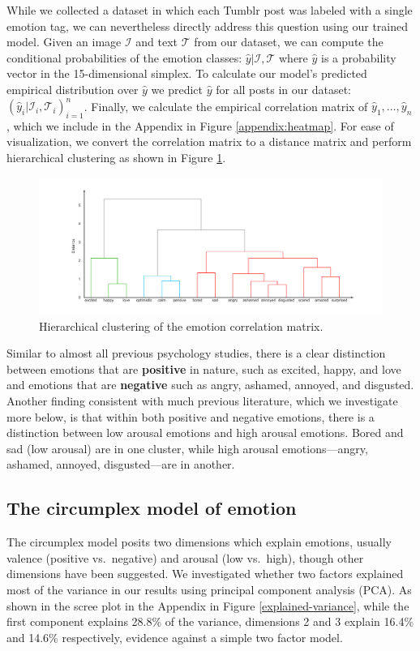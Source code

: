 \documentclass{article} %
\begin{document}
While we collected a dataset in which each Tumblr post was labeled with a single emotion tag, we can nevertheless directly address this question using our trained model. Given an image $\mathcal{I}$ and text $\mathcal{T}$ from our dataset, we can compute the conditional probabilities of the emotion classes: $\hat y | \mathcal{I}, \mathcal{T}$ where $\hat y$ is a probability vector in the 15-dimensional simplex. To calculate our model's predicted empirical distribution over $\hat y$ we predict $\hat y$ for all posts in our dataset: $(\hat y_i | \mathcal{I}_i, \mathcal{T}_i)_{i=1}^n$. Finally, we calculate the empirical correlation matrix of $\hat y_1, \ldots, \hat y_n$, which we include in the Appendix in Figure \ref{appendix:heatmap}. For ease of visualization, we convert the correlation matrix to a distance matrix and perform hierarchical clustering as shown in Figure \ref{dendrogram}.
\begin{figure}[H]
    \centering
    \includegraphics[width=\textwidth]{Images/dendrogram_clean.jpg}
    \caption{Hierarchical clustering of the emotion correlation matrix.}
    \label{dendrogram}
\end{figure}

Similar to almost all previous psychology studies, there is a clear distinction between emotions that are \textbf{positive} in nature, such as excited, happy, and love and emotions that are \textbf{negative} such as angry, ashamed, annoyed, and disgusted. Another finding consistent with much previous literature, which we investigate more below, is that within both positive and negative emotions, there is a distinction between  low arousal emotions and high arousal emotions. Bored and sad (low arousal) are in one cluster, while high arousal emotions---angry, ashamed, annoyed, disgusted---are in another. 

\subsection{The circumplex model of emotion}
The circumplex model \citep{posner2005circumplex} posits two dimensions which explain emotions, usually valence (positive vs.~negative) and arousal (low vs.~high), though other dimensions have been suggested. We investigated whether two factors explained most of the variance in our results using principal component analysis (PCA). As shown in the scree plot in the Appendix in Figure \ref{explained-variance}, while the first component explains 28.8\% of the variance, dimensions 2 and 3 explain 16.4\% and 14.6\% respectively, evidence against a simple two factor model.
\end{document}
